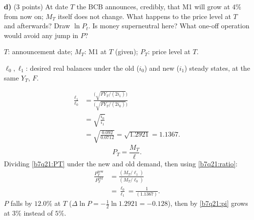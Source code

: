 \textbf{d)} (3 points) At date $T$ the BCB announces, credibly, that M1 will grow at $4\%$ from now on; $M_T$ itself does not change.
What happens to the price level at $T$ and afterwards? Draw $\ln P_t$. Is money superneutral here? What one-off operation would
avoid any jump in $P$?
\resolespaco
\begin{sol}
\begin{notacao}
\item $T$: announcement date; $M_T$: M1 at $T$ (given); $P_T$: price level at $T$.
\item $\ell_0,\ell_1$: desired real balances under the old ($i_0$) and new ($i_1$) steady states, at the same $Y_T$, $F$.
\end{notacao}
\begin{align}
\frac{\ell_1}{\ell_0}&=\frac{\big(\sqrt{FY_T/(2i_1)}\big)}{\big(\sqrt{FY_T/(2i_0)}\big)}\nonumber\\
&=\sqrt{\frac{i_0}{i_1}} \label{b7q21:ratio}\\
&=\sqrt{\frac{0.092}{0.0712}}=\sqrt{1.2921}=1.1367.\nonumber
\end{align}
\begin{equation}
P_T=\frac{M_T}{\ell}. \label{b7q21:PT}
\end{equation}
Dividing \eqref{b7q21:PT} under the new and old demand, then using \eqref{b7q21:ratio}:
\begin{align*}
\frac{P_T^{\text{new}}}{P_T^{\text{old}}}&=\frac{(M_T/\ell_1)}{(M_T/\ell_0)}\\
&=\frac{\ell_0}{\ell_1}=\frac1{(1.1367)}.
\end{align*}
$P$ falls by $12.0\%$ at $T$ ($\Delta\ln P=-\frac12\ln1.2921=-0.128$), then by \eqref{b7q21:pi} grows at $3\%$ instead of $5\%$.
\begin{center}
\end{center}
\end{sol}
